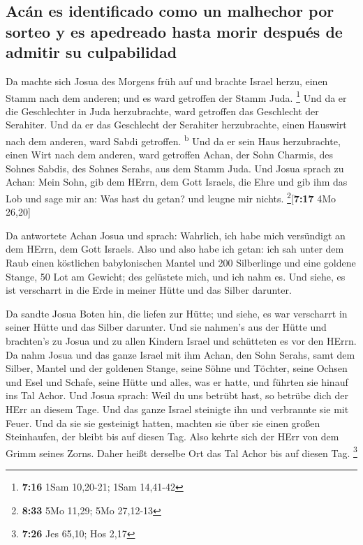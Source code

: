 \hypertarget{acuxe1n-es-identificado-como-un-malhechor-por-sorteo-y-es-apedreado-hasta-morir-despuuxe9s-de-admitir-su-culpabilidad}{%
\subsection{Acán es identificado como un malhechor por sorteo y es
apedreado hasta morir después de admitir su
culpabilidad}\label{acuxe1n-es-identificado-como-un-malhechor-por-sorteo-y-es-apedreado-hasta-morir-despuuxe9s-de-admitir-su-culpabilidad}}

 Da machte sich Josua des Morgens früh auf und brachte
Israel herzu, einen Stamm nach dem anderen; und es ward getroffen der
Stamm Juda. \footnote{\textbf{7:16} 1Sam 10,20-21; 1Sam 14,41-42}
 Und da er die Geschlechter in Juda herzubrachte, ward
getroffen das Geschlecht der Serahiter. Und da er das Geschlecht der
Serahiter herzubrachte, einen Hauswirt nach dem anderen, ward Sabdi
getroffen. \textsuperscript{b}  Und da er sein Haus
herzubrachte, einen Wirt nach dem anderen, ward getroffen Achan, der
Sohn Charmis, des Sohnes Sabdis, des Sohnes Serahs, aus dem Stamm Juda.
 Und Josua sprach zu Achan: Mein Sohn, gib dem HErrn, dem
Gott Israels, die Ehre und gib ihm das Lob und sage mir an: Was hast du
getan? und leugne mir nichts. \footnote{\textbf{8:33} 5Mo 11,29; 5Mo
  27,12-13}{[}\textbf{7:17} 4Mo 26,20{]}

 Da antwortete Achan Josua und sprach: Wahrlich, ich habe
mich versündigt an dem HErrn, dem Gott Israels. Also und also habe ich
getan:  ich sah unter dem Raub einen köstlichen
babylonischen Mantel und 200 Silberlinge und eine goldene Stange, 50 Lot
am Gewicht; des gelüstete mich, und ich nahm es. Und siehe, es ist
verscharrt in die Erde in meiner Hütte und das Silber darunter.

 Da sandte Josua Boten hin, die liefen zur Hütte; und
siehe, es war verscharrt in seiner Hütte und das Silber darunter.
 Und sie nahmen's aus der Hütte und brachten's zu Josua
und zu allen Kindern Israel und schütteten es vor den HErrn.
 Da nahm Josua und das ganze Israel mit ihm Achan, den
Sohn Serahs, samt dem Silber, Mantel und der goldenen Stange, seine
Söhne und Töchter, seine Ochsen und Esel und Schafe, seine Hütte und
alles, was er hatte, und führten sie hinauf ins Tal Achor.
 Und Josua sprach: Weil du uns betrübt hast, so betrübe
dich der HErr an diesem Tage. Und das ganze Israel steinigte ihn und
verbrannte sie mit Feuer. Und da sie sie gesteinigt hatten,
 machten sie über sie einen großen Steinhaufen, der
bleibt bis auf diesen Tag. Also kehrte sich der HErr von dem Grimm
seines Zorns. Daher heißt derselbe Ort das Tal Achor bis auf diesen Tag.
\footnote{\textbf{7:26} Jes 65,10; Hos 2,17}

